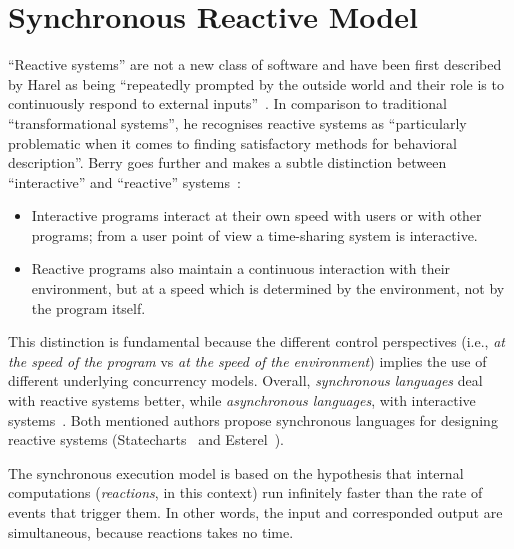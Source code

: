 \documentclass{acm_proc_article-sp}
\newcommand{\1}{\;}
\newcommand{\2}{\;\;}
\newcommand{\3}{\;\;\;}
\newcommand{\5}{\;\;\;\;\;}
\begin{document}
\section{Synchronous Reactive Model}
\label{sec.synchronous}

``Reactive systems'' are not a new class of software and have been first 
described by Harel as being ``repeatedly prompted by the outside world and 
their role is to continuously respond to external 
inputs''~\cite{statecharts.reactive}.
In comparison to traditional ``transformational systems'', he recognises 
reactive systems as ``particularly problematic when it comes to finding 
satisfactory methods for behavioral description''.
%
Berry goes further and makes a subtle distinction between ``interactive'' and 
``reactive'' systems~\cite{rp.synchronous}:
%
\begin{itemize}
\item Interactive programs interact at their own speed with users or with other 
programs; from a user point of view a time-sharing system is interactive.
\item Reactive programs also maintain a continuous interaction with their 
environment, but at a speed which is determined by the environment, not by the 
program itself.
\end{itemize}


This distinction is fundamental because the different control perspectives 
(i.e., \emph{at the speed of the program} vs \emph{at the speed of the 
environment}) implies the use of different underlying concurrency models.
%
Overall, \emph{synchronous languages} deal with reactive systems better, while 
\emph{asynchronous languages}, with interactive systems~\cite{esterel.crp}.
%
Both mentioned authors propose synchronous languages for designing reactive 
systems (Statecharts~\cite{statecharts.visual} and 
Esterel~\cite{esterel.ieee91}).


The synchronous execution model is based on the hypothesis that internal 
computations (\emph{reactions}, in this context) run infinitely faster than the 
rate of events that trigger them.
In other words, the input and corresponded output are simultaneous, because 
reactions takes no time.
\end{document}
